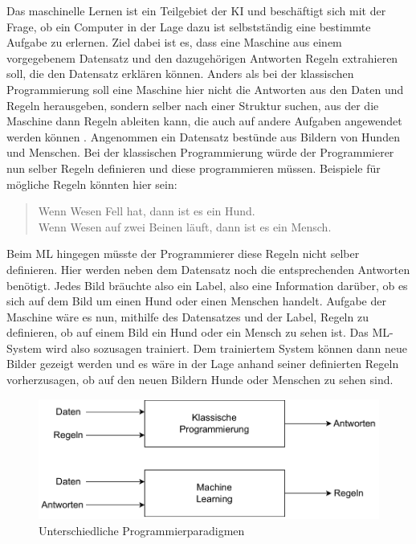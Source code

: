 Das maschinelle Lernen ist ein Teilgebiet der \ac{KI} und beschäftigt sich mit der Frage, ob ein Computer in der Lage dazu ist selbstständig eine bestimmte Aufgabe
zu erlernen. Ziel dabei ist es, dass eine Maschine aus einem vorgegebenem Datensatz und den dazugehörigen Antworten Regeln extrahieren soll, die den Datensatz erklären
können. Anders als bei der klassischen Programmierung soll eine Maschine hier nicht die Antworten aus den Daten und Regeln herausgeben, sondern selber nach einer
Struktur suchen, aus der die Maschine dann Regeln ableiten kann, die auch auf andere Aufgaben angewendet werden können \cite[vgl. S.23f.]{DL_PY}. Angenommen ein Datensatz bestünde aus
Bildern von Hunden und Menschen. Bei der klassischen Programmierung würde der Programmierer nun selber Regeln definieren und diese programmieren müssen. Beispiele für 
mögliche Regeln könnten hier sein:
\begin{quote}
    Wenn Wesen Fell hat, dann ist es ein Hund.\\
    Wenn Wesen auf zwei Beinen läuft, dann ist es ein Mensch.
\end{quote}
Beim \ac{ML} hingegen müsste der Programmierer diese Regeln nicht selber definieren. Hier werden neben dem Datensatz noch die entsprechenden Antworten benötigt. 
Jedes Bild bräuchte also ein Label, also eine Information darüber, ob es sich auf dem Bild um einen Hund oder einen Menschen handelt. Aufgabe der Maschine wäre es nun, 
mithilfe des Datensatzes und der Label, Regeln zu definieren, ob auf einem Bild ein Hund oder ein Mensch zu sehen ist. Das \ac{ML}-System wird also sozusagen trainiert. 
Dem trainiertem System können dann neue Bilder gezeigt werden und es wäre in der Lage anhand seiner definierten Regeln vorherzusagen, ob auf den neuen Bildern Hunde oder 
Menschen zu sehen sind. 

\begin{figure}[H]
    \centering
    \includegraphics[scale=0.7]{abbildungen/Programmierparadigmen.pdf}
    \caption{Unterschiedliche Programmierparadigmen \cite[S.23]{DL_PY}}
    \label{fig:Programmierparadigma}
\end{figure}

